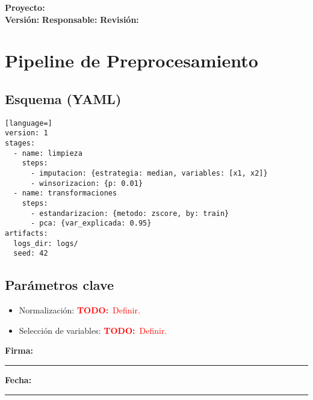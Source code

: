 \documentclass[11pt]{article}
\newcommand{\project}{\textbf{Proyecto:} \underline{\hspace{7cm}}}
\newcommand{\version}{\textbf{Versi\'on:} \underline{\hspace{3cm}}}
\newcommand{\owner}{\textbf{Responsable:} \underline{\hspace{5cm}}}
\newcommand{\review}{\textbf{Revisi\'on:} \underline{\hspace{3cm}}}
\newcommand{\signatureline}{\vspace{0.5cm}\noindent\textbf{Firma:}\ \rule{6cm}{0.4pt} \hfill \textbf{Fecha:}\ \rule{3cm}{0.4pt}}
\newcommand{\todo}[1]{\textcolor{red}{\textbf{TODO:}~#1}}
\begin{document}
\begin{flushright}
\project \\ \version \hspace{1cm} \owner \hspace{1cm} \review
\end{flushright}


\section*{Pipeline de Preprocesamiento}
\subsection*{Esquema (YAML)}
\noindent\begin{minipage}{\linewidth}
\begin{lstlisting}[language=]
version: 1
stages:
  - name: limpieza
    steps:
      - imputacion: {estrategia: median, variables: [x1, x2]}
      - winsorizacion: {p: 0.01}
  - name: transformaciones
    steps:
      - estandarizacion: {metodo: zscore, by: train}
      - pca: {var_explicada: 0.95}
artifacts:
  logs_dir: logs/
  seed: 42
\end{lstlisting}
\end{minipage}

\subsection*{Par\'ametros clave}
\begin{itemize}
  \item Normalizaci\'on: \todo{Definir.}
  \item Selecci\'on de variables: \todo{Definir.}
\end{itemize}
\signatureline

\label{LastPage}
\end{document}
